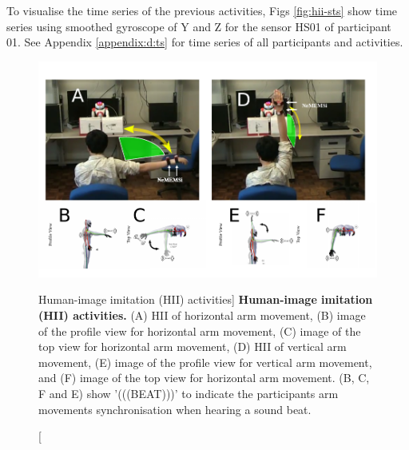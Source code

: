 To visualise the time series of the previous activities, Figs 
\ref{fig:hii-sts} show time series using smoothed gyroscope of Y and Z 
for the sensor HS01 of participant 01.
See Appendix \ref{appendix:d:ts} for 
time series of all participants and activities. 
\begin{figure}
  \centering
  \includegraphics[width=1.0\textwidth]{hii}
    \caption
	[Human-image imitation (HII) activities]{
	{\bf Human-image imitation (HII) activities.} 
		(A) HII of horizontal arm movement, 
		(B) image of the profile view for horizontal arm movement,
		(C) image of the top view for horizontal arm movement,
		(D) HII of vertical arm movement, 
		(E) image of the profile view for vertical arm movement, and
		(F) image of the top view for horizontal arm movement.
		(B, C, F and E) show '(((BEAT)))' to indicate the participants
		arm movements synchronisation when hearing a sound beat.
        }
    \label{fig:hii}
\end{figure}
